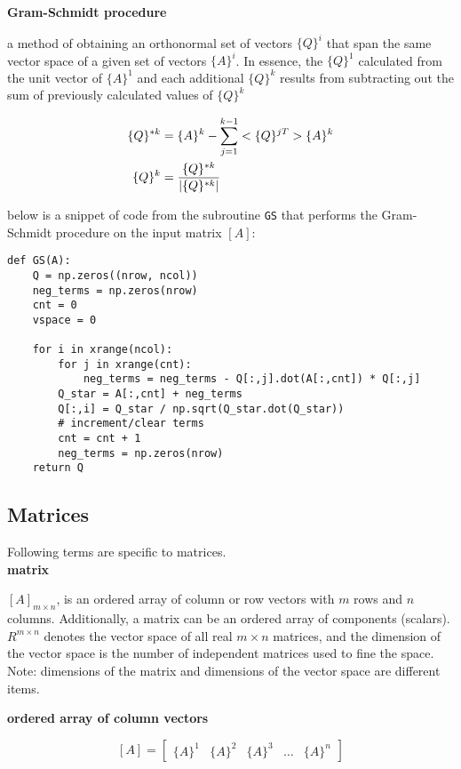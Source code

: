 \documentclass[letterpaper, 10pt, oneside]{article}
\newenvironment{dd}[1]{
	\noindent
	\textbf{\normalsize{#1}}
	\hspace{0.1in}
	\small
	\rmfamily
	}
	{\medskip}
\DeclarePairedDelimiter\abs{\lvert}{\rvert}%
\begin{document}
\begin{dd}{Gram-Schmidt procedure}
a method of obtaining an orthonormal set of vectors $\{Q\}^i$ that span the same vector space of a given set of vectors $\{A\}^i$. In essence, the $\{Q\}^1$  calculated from the unit vector of $\{A\}^1$ and each additional $\{Q\}^k$ results from subtracting out the sum of previously calculated values of $\{Q\}^k$

\begin{align*}
\{Q\}^{*k} &= \{A\}^k - \sum_{j=1}^{k-1} <\{Q\}^{jT}>\{A\}^k \\
\{Q\}^k &= \frac{\{Q\}^{*k}}{\abs{\{Q\}^{*k}}}
\end{align*}

below is a snippet of code from the subroutine \verb|GS| that performs the Gram-Schmidt procedure on the input matrix $[A]$:

\begin{lstlisting}
def GS(A):
    Q = np.zeros((nrow, ncol))
    neg_terms = np.zeros(nrow)
    cnt = 0
    vspace = 0

    for i in xrange(ncol):
        for j in xrange(cnt):
            neg_terms = neg_terms - Q[:,j].dot(A[:,cnt]) * Q[:,j]
        Q_star = A[:,cnt] + neg_terms
        Q[:,i] = Q_star / np.sqrt(Q_star.dot(Q_star))
        # increment/clear terms
        cnt = cnt + 1
        neg_terms = np.zeros(nrow)
    return Q
\end{lstlisting}
 \end{dd}
\subsection{Matrices\\}
Following terms are specific to matrices.\\

\begin{dd}{matrix}
$[A]_{m\times n}$, is an ordered array of column or row vectors with $m$ rows and $n$ columns.  Additionally, a matrix can be an ordered array of components (scalars). $R^{m\times n}$ denotes the vector space of all real $m \times n$ matrices, and the dimension of the vector space is the number of independent matrices used to fine the space. Note: dimensions of the matrix and dimensions of the vector space are different items.
\end{dd}


\begin{dd}{ordered array of column vectors}
	\[ [A] =
	\begin{bmatrix}
	\{A\}^1 & \{A\}^2 & \{A\}^3 & \hdots & \{A\}^n 
	\end{bmatrix}
	\]
\end{dd}
\end{document}
